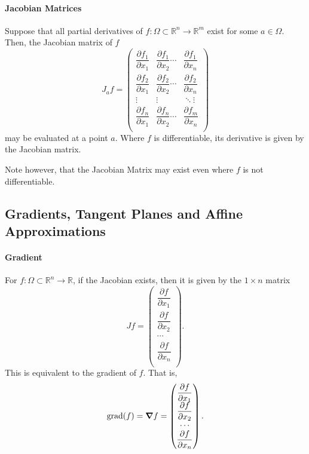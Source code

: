 \paragraph{Jacobian Matrices}
Suppose that all partial derivatives of \(f:\Omega \subset \mathbb{R}^n \to \mathbb{R}^m\)
exist for some \(a\in \Omega\). Then, the Jacobian matrix of \(f\)
\[
    J_a f = 
    \begin{pmatrix}
    \dfrac{\partial f_1}{\partial x_1} & \dfrac{\partial f_1}{\partial x_2} \cdots & \dfrac{\partial f_1}{\partial x_n} \\
    \dfrac{\partial f_2}{\partial x_1} & \dfrac{\partial f_2}{\partial x_2} \cdots & \dfrac{\partial f_2}{\partial x_n} \\
    \vdots & \vdots & \ddots \vdots \\
    \dfrac{\partial f_n}{\partial x_1} & \dfrac{\partial f_n}{\partial x_2} \cdots & \dfrac{\partial f_m}{\partial x_n} \\
    \end{pmatrix}
\]
may be evaluated at a point \(a\).
Where \(f\) is differentiable, its derivative is given by the Jacobian matrix.

Note however, that the Jacobian Matrix may exist even where \(f\) is not differentiable.

\subsection{Gradients, Tangent Planes and Affine Approximations}

\paragraph{Gradient}
For \(f: \Omega\subset \mathbb{R}^n\to \mathbb{R}\), if the Jacobian exists,
then it is given by the \(1\times n\) matrix
\[
    Jf = \begin{pmatrix}
        \dfrac{\partial f}{\partial x_1} \\
        \dfrac{\partial f}{\partial x_2} \\
        \cdots                           \\
        \dfrac{\partial f}{\partial x_n} \\
    \end{pmatrix}.
\]
This is equivalent to the gradient of \(f\). That is,
\[
    \text{grad}(f) = \grad f = 
    \begin{pmatrix}
        \dfrac{\partial f}{\partial x_1} \\
        \dfrac{\partial f}{\partial x_2} \\
        \cdots                           \\
        \dfrac{\partial f}{\partial x_n} \\
    \end{pmatrix}.
\]

